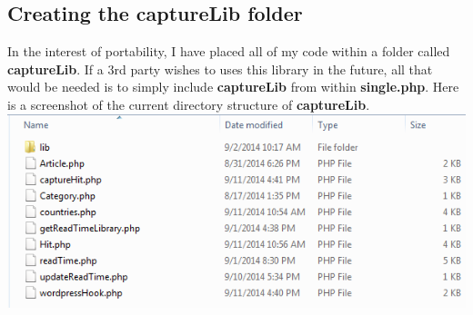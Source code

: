 \documentclass[12pt]{article}
\begin{document}
\subsection{Creating the captureLib folder}
In the interest of portability, I have placed all of my code within a folder called \textbf{captureLib}. If a 3rd party wishes to uses this library in the future, all that would be needed is to simply include \textbf{captureLib} from within \textbf{single.php}. Here is a screenshot of the current directory structure of \textbf{captureLib}. \\

\noindent\includegraphics[scale=0.8]{img/capturelib}    
\end{document}
